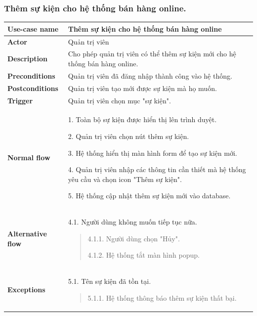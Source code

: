 \subsubsection{Thêm sự kiện cho hệ thống bán hàng online.}
{
    \setlength\extrarowheight{6pt}
    \begin{longtable}{| p{} | p{} |}
        \hline
        \textbf{Use-case name}
         &
        Thêm sự kiện cho hệ thống bán hàng online
        \\
        \hline
        \textbf{Actor}
         &
        Quản trị viên
        \\
        \hline
        \textbf{Description}
         &
        Cho phép quản trị viên có thể thêm sự kiện mới cho hệ thống bán hàng online.
        \\
        \hline
        \textbf{Preconditions}
         &
        Quản trị viên đã đăng nhập thành công vào hệ thống.
        \\
        \hline
        \textbf{Postconditions}
         &
        Quản trị viên tạo mới được sự kiện mà họ muốn.
        \\
        \hline
        \textbf{Trigger}
         &
        Quản trị viên chọn mục "sự kiện".
        \\
        \hline
        \begin{flushleft}
            \textbf{Normal flow}
        \end{flushleft}
         &
        1. Toàn bộ sự kiện được hiển thị lên trình duyệt.

        2. Quản trị viên chọn nút thêm sự kiện.

        3. Hệ thống hiển thị màn hình form để tạo sự kiện mới.

        4. Quản trị viên nhập các thông tin cần thiết mà hệ thống yêu cầu và chọn icon "Thêm sự kiện".

        5. Hệ thống cập nhật thêm sự kiện mới vào database.
        \\
        \hline
        \begin{flushleft}
            \textbf{Alternative flow}
        \end{flushleft}
         &
        4.1. Người dùng không muốn tiếp tục nữa.
        \begin{quote}
            4.1.1. Người dùng chọn "Hủy".

            4.1.2. Hệ thống tắt màn hình popup.
        \end{quote}
        \\
        \hline
        \begin{flushleft}
            \textbf{Exceptions}
        \end{flushleft}
         &
        5.1. Tên sự kiện đã tồn tại.
        \begin{quote}
            5.1.1. Hệ thống thông báo thêm sự kiện thất bại.


\end{quote}
\end{longtable}}
